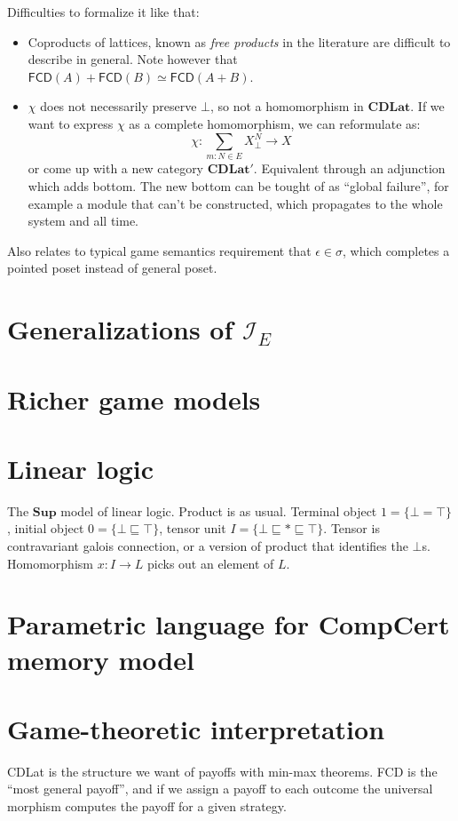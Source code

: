 \documentclass[11pt,oneside,draft]{book}
\theoremstyle{definition}
\newcommand{\kw}[1]{\ensuremath{ \mathsf{#1} }}
\newcommand{\refby}{\sqsubseteq} %
\begin{document}
Difficulties to formalize it like that:
\begin{itemize}
  \item Coproducts of lattices,
    known as \emph{free products} in the literature
    \citep{...}
    are difficult to describe in general.
    Note however that
    $\kw{FCD}(A) + \kw{FCD}(B) \simeq \kw{FCD}(A + B)$.
  \item $\chi$ does not necessarily preserve $\bot$,
    so not a homomorphism in $\mathbf{CDLat}$.
    If we want to express $\chi$ as a complete homomorphism,
    we can reformulate as:
    \[
      \chi : \sum_{m:N \in E} X^N_\bot \rightarrow X
    \]
    or come up with a new category $\mathbf{CDLat}'$.
    Equivalent through an adjunction which adds bottom.
    The new bottom can be tought of as ``global failure'',
    for example a module that can't be constructed,
    which propagates to the whole system and all time.
\end{itemize}
Also relates to typical game semantics requirement
that $\epsilon \in \sigma$,
which completes a pointed poset instead of general poset.

\section{Generalizations of $\mathcal{I}_E$}

\section{Richer game models}

\section{Linear logic}

The $\mathbf{Sup}$ model of linear logic.
Product is as usual.
Terminal object $1 = \{\bot = \top\}$,
initial object $0 = \{\bot \refby \top\}$,
tensor unit $I = \{\bot \refby * \refby \top\}$.
Tensor is contravariant galois connection,
or a version of product that identifies the $\bot$s.
Homomorphism $x : I \rightarrow L$
picks out an element of $L$.

\section{Parametric language for CompCert memory model}

\section{Game-theoretic interpretation}

CDLat is the structure we want of payoffs
with min-max theorems.
FCD is the ``most general payoff'',
and if we assign a payoff to each outcome
the universal morphism
computes the payoff for a given strategy.


%



\end{document}
